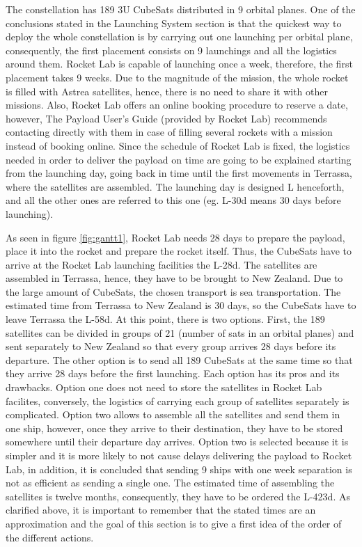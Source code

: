The constellation has 189 3U CubeSats distributed in 9 orbital planes. One of the conclusions stated in the Launching System section  is that the quickest way to deploy the whole constellation is by carrying out one launching per orbital plane, consequently, the first placement consists on 9 launchings and all the logistics around them. Rocket Lab is capable of launching once a week, therefore, the first placement takes 9 weeks. Due to the magnitude of the mission, the whole rocket is filled with Astrea satellites, hence, there is no need to share it with other missions. Also, Rocket Lab offers an online booking procedure to reserve a date, however, The Payload User's Guide (provided by Rocket Lab) recommends contacting directly with them in case of filling several rockets with a mission instead of booking online.  
\newline
Since the schedule of Rocket Lab is fixed, the logistics needed in order to deliver the payload on time are going to be explained starting from the launching day, going back in time until the first movements in Terrassa, where the satellites are assembled. 
The launching day is designed L henceforth, and all the other ones are referred to this one (eg. L-30d means 30 days before launching). 


As seen in figure \ref{fig:gantt1}, Rocket Lab needs 28 days to prepare the payload, place it into the rocket and prepare the rocket itself. Thus, the CubeSats have to arrive at the Rocket Lab launching facilities the L-28d. The satellites are assembled in Terrassa, hence, they have to be brought to New Zealand. Due to the large amount of CubeSats, the chosen transport is sea transportation. The estimated time from Terrassa to New Zealand is 30 days, so the CubeSats have to leave Terrassa the L-58d. At this point, there is two options. First, the 189 satellites can be divided in groups of 21 (number of sats in an orbital planes) and sent separately to New Zealand so that every group arrives 28 days before its departure. The other option is to send all 189 CubeSats at the same time so that they arrive 28 days before the first launching. Each option has its pros and its drawbacks. Option one does not need to store the satellites in Rocket Lab facilites, conversely, the logistics of carrying each group of satellites separately is complicated. Option two allows to assemble all the satellites and send them in one ship, however, once they arrive to their destination, they have to be stored somewhere until their departure day arrives. Option two is selected because it is simpler and it is more likely to not cause delays delivering the payload to Rocket Lab, in addition, it is concluded that sending 9 ships with one week separation is not as efficient as sending a single one. 
\newline
The estimated time of assembling the satellites is twelve months, consequently, they have to be ordered the L-423d. 
\newline
As clarified above, it is important to remember that the stated times are an approximation and the goal of this section is to give a first idea of the order of the different actions. 
